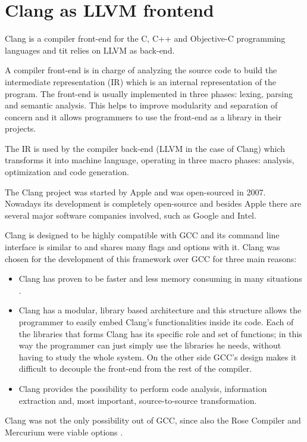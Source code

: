 \documentclass[a4paper,11pt,oneside]{book}
\begin{document}
\section{Clang as LLVM frontend}

Clang \cite{clang} is a compiler front-end for the C, C++ and Objective-C programming languages and tit relies on LLVM as back-end. 

A compiler front-end is in charge of analyzing the source code to build the intermediate representation (IR) which is an internal representation of the program. The front-end is usually implemented in three phases: lexing, parsing and semantic analysis. This helps to improve modularity and separation of concern and it allows programmers to use the front-end as a library in their projects. 

The IR is used by the compiler back-end (LLVM in the case of Clang) which transforms it into machine language, operating in three macro phases: analysis, optimization and code generation. 

The Clang project was started by Apple and was open-sourced in 2007. Nowadays its development is completely open-source and besides Apple there are several major software companies involved, such as Google and Intel.

Clang is designed to be highly compatible with GCC and its command line interface is similar to and shares many flags and options with it. Clang was chosen for the development of this framework over GCC for three main reasons:
\begin{itemize}
 \item Clang has proven to be faster and less memory consuming in many situations \cite{clanggcc}. 
 \item Clang has a modular, library based architecture and this structure allows the programmer to easily embed Clang’s functionalities inside its code. Each of the libraries that forms Clang has its specific role and set of functions; in this way the programmer can just simply use the libraries he needs, without having to study the whole system. On the other side GCC's design makes it difficult to decouple the front-end from the rest of the compiler.
 \item Clang provides the possibility to perform code analysis, information extraction and, most important, source-to-source transformation.
\end{itemize}

Clang was not the only possibility out of GCC, since also the Rose Compiler and Mercurium were viable options \cite{rose}. 
\end{document}
